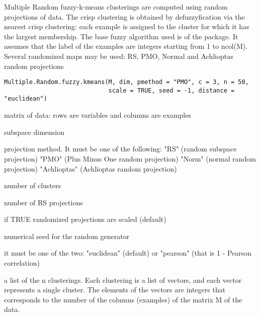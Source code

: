 \documentclass{article}
\begin{document}
\begin{Description}\relax
Multiple Random fuzzy-k-means clusterings are computed using random projections of data.
The crisp clustering is obtained by defuzzyfication via the nearest crisp clustering: each example is assigned to the
cluster for which it has the largest membership. The base fuzzy algorithm used is  of the 
package.
It assumes that the label of the examples are integers starting from 1 to ncol(M).
Several randomized maps may be used: RS, PMO, Normal and Achlioptas random projections
\end{Description}
\begin{Usage}
\begin{verbatim}
Multiple.Random.fuzzy.kmeans(M, dim, pmethod = "PMO", c = 3, n = 50, 
                             scale = TRUE, seed = -1, distance = "euclidean")
\end{verbatim}
\end{Usage}
\begin{Arguments}
\begin{ldescription}
\item[\code{M}] matrix of data: rows are variables and columns are examples 
\item[\code{dim}] subspace dimension 
\item[\code{pmethod}] projection method. It must be one of the following: 
"RS" (random subspace projection)
"PMO" (Plus Minus One random projection)
"Norm" (normal random projection)
"Achlioptas" (Achlioptas random projection) 
\item[\code{c}] number of clusters 
\item[\code{n}] number of RS projections 
\item[\code{scale}] if TRUE randomized projections are scaled (default) 
\item[\code{seed}] numerical seed for the random generator 
\item[\code{distance}] it must be one of the two: "euclidean" (default) or "pearson" (that is 1 - Pearson correlation) 
\end{ldescription}
\end{Arguments}
\begin{Value}
a list  of the n clusterings. Each clustering is a list of vectors,
and each vector represents a single cluster. The elements of the vectors are integers that corresponds to the number
of the columns (examples) of the matrix M of the data.
\end{Value}
\end{document}
